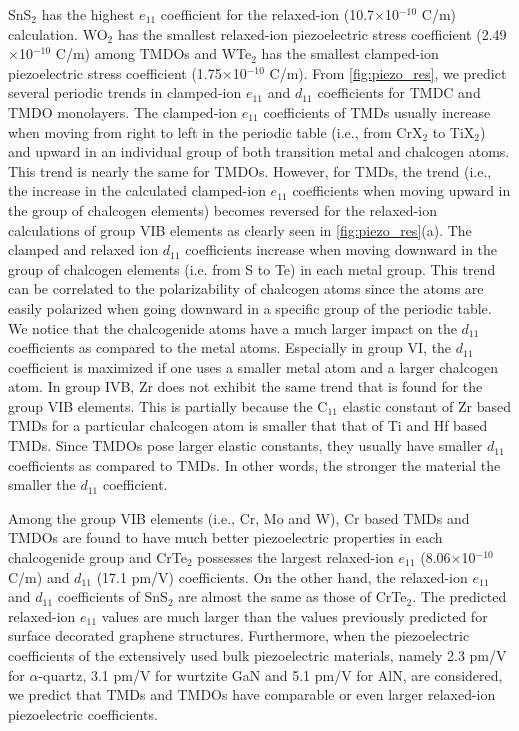 SnS$_2$ has the highest $e_{11}$ coefficient for the relaxed-ion (10.7$\times$10$^{-10}$ C/m) calculation. WO$_2$ has the smallest relaxed-ion piezoelectric stress coefficient (2.49$\times$10$^{-10}$ C/m) among TMDOs and WTe$_2$ has the smallest clamped-ion piezoelectric stress coefficient (1.75$\times$10$^{-10}$ C/m). From \autoref{fig:piezo_res}, we predict several  periodic trends in clamped-ion $e_{11}$ and $d_{11}$ coefficients for TMDC and TMDO monolayers. The clamped-ion $e_{11}$ coefficients of TMDs usually increase when moving from right to left in the periodic table (i.e., from CrX$_{2}$ to TiX$_{2}$) and upward in an individual group of both transition metal and chalcogen atoms.  This trend is nearly the same for TMDOs. However, for TMDs, the trend (i.e., the increase in the calculated clamped-ion $e_{11}$ coefficients when moving upward in the group of chalcogen elements) becomes reversed for the relaxed-ion calculations of group VIB elements as clearly seen in \autoref{fig:piezo_res}(a). 
The clamped and relaxed ion $d_{11}$ coefficients increase when moving downward in the group of chalcogen elements (i.e. from S to Te) in each metal group.  This trend can be correlated to the polarizability of chalcogen atoms since the atoms are easily polarized when going downward in a specific group of the periodic table.  We notice that the chalcogenide atoms have a much larger impact on the $d_{11}$ coefficients as compared to the metal atoms.  Especially in group VI, the $d_{11}$ coefficient is maximized if one uses a smaller metal atom and a larger chalcogen atom. In group IVB, Zr does not exhibit the same trend that is found for the group VIB elements. This is partially because the C$_{11}$ elastic constant of Zr based TMDs for a particular chalcogen atom is smaller that that of Ti and Hf based TMDs. Since TMDOs pose larger elastic constants, they usually have smaller $d_{11}$ coefficients as compared to TMDs. In other words, the stronger the material the smaller the $d_{11}$ coefficient.  

Among the group VIB elements (i.e., Cr, Mo and W), Cr based TMDs and TMDOs are found to have much better piezoelectric properties in each chalcogenide group and CrTe$_2$ possesses the largest relaxed-ion  $e_{11}$ (8.06$\times$10$^{-10}$ C/m) and $d_{11}$ (17.1 pm/V) coefficients. On the other hand, the relaxed-ion $e_{11}$ and $d_{11}$ coefficients of SnS$_{2}$ are  almost the same as those of CrTe$_2$. The predicted relaxed-ion $e_{11}$ values are much larger than the values previously predicted for surface decorated graphene structures\cite{Ong2012}. Furthermore, when the piezoelectric coefficients of the extensively used bulk piezoelectric materials, namely 2.3 pm/V for  $\alpha$-quartz\cite{Bechmann1958}, 3.1 pm/V for wurtzite GaN\cite{Lueng2000} and 5.1 pm/V for AlN\cite{Lueng2000}, are considered, we predict that TMDs and TMDOs have comparable or even larger relaxed-ion piezoelectric coefficients.

